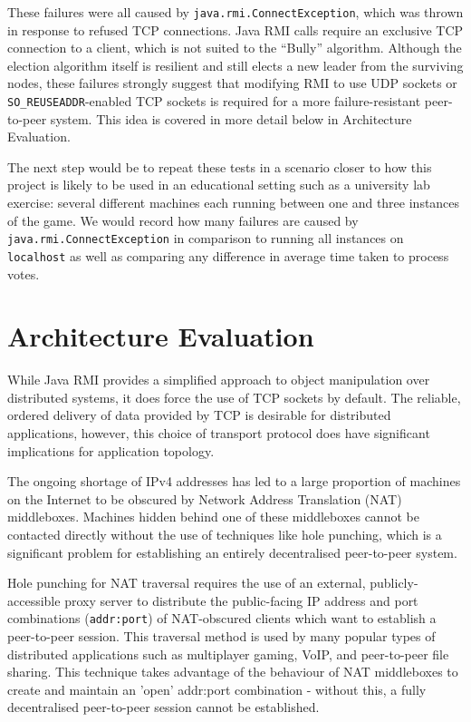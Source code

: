 \documentclass[conference]{IEEEtran}
\begin{document}
These failures were all caused by \texttt{java.rmi.ConnectException}, which was thrown in response to refused TCP connections. Java RMI calls require an exclusive TCP connection to a client, which is not suited to the ``Bully'' algorithm. Although the election algorithm itself is resilient and still elects a new leader from the surviving nodes, these failures strongly suggest that modifying RMI to use UDP sockets or \texttt{SO\_REUSEADDR}-enabled TCP sockets is required for a more failure-resistant peer-to-peer system. This idea is covered in more detail below in Architecture Evaluation.

The next step would be to repeat these tests in a scenario closer to how this project is likely to be used in an educational setting such as a university lab exercise: several different machines each running between one and three instances of the game. We would record how many failures are caused by \texttt{java.rmi.ConnectException} in comparison to running all instances on \texttt{localhost} as well as comparing any difference in average time taken to process votes.

\section{Architecture Evaluation}
While Java RMI provides a simplified approach to object manipulation over distributed systems, it does force the use of TCP sockets by default. The reliable, ordered delivery of data provided by TCP is desirable for distributed applications, however, this choice of transport protocol does have significant implications for application topology.

The ongoing shortage of IPv4 addresses has led to a large proportion of machines on the Internet to be obscured by Network Address Translation (NAT) middleboxes. Machines hidden behind one of these middleboxes cannot be contacted directly without the use of techniques like hole punching, which is a significant problem for establishing an entirely decentralised peer-to-peer system.

Hole punching for NAT traversal requires the use of an external, publicly-accessible proxy server to distribute the public-facing IP address and port combinations (\texttt{addr:port}) of NAT-obscured clients which want to establish a peer-to-peer session. This traversal method is used by many popular types of distributed applications such as multiplayer gaming, VoIP, and peer-to-peer file sharing. This technique takes advantage of the behaviour of NAT middleboxes to create and maintain an 'open' addr:port combination - without this, a fully decentralised peer-to-peer session cannot be established.
\end{document}

